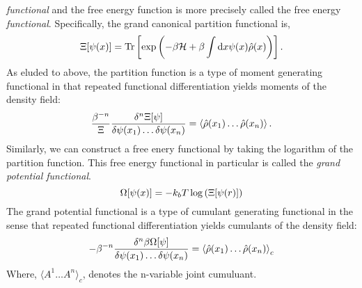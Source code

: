 \textit{functional} and the free energy function is more precisely called the
free energy \textit{functional}.  Specifically, the grand canonical partition
functional is,
%
\begin{equation} \Xi[\psi(x)] = \mathrm{Tr}\left[ \exp\left(-\beta\mathcal{H} +\beta\int\mathrm{d}x
\psi(x) \hat{\rho}(x)\right) \right].  \end{equation}
%
As eluded to above, the partition function is a type of moment generating
functional in that repeated functional differentiation yields moments of the
density field:
%
\begin{equation} \frac{\beta^{-n}}{\Xi} \frac{\delta^n \Xi[\psi]}{\delta \psi(x_1) \dots
\delta\psi(x_n)} = \left\langle \hat{\rho}(x_1)\dots\hat{\rho}(x_n) \right\rangle.  \end{equation}
%
Similarly, we can construct a free enery functional by taking the logarithm of
the partition function. This free energy functional in particular is called the
\textit{grand potential functional}.
%
\begin{equation} \Omega[\psi(x)] = -k_bT\log\left(\Xi[\psi(r)]\right) \end{equation}
%
The grand potential functional is a type of cumulant generating functional in
the sense that repeated functional differentiation yields cumulants of the
density field:
%
\begin{equation} -\beta^{-n}\frac{\delta^n
\beta\Omega[\psi]}{\delta\psi(x_1)\dots\delta\psi(x_n)} =
\left\langle \hat{\rho}(x_1)\dots\hat{\rho}(x_n) \right\rangle_c \end{equation}
%
Where, $\langle A^1\dots A^n \rangle_c$, denotes the n-variable joint
cumuluant.

